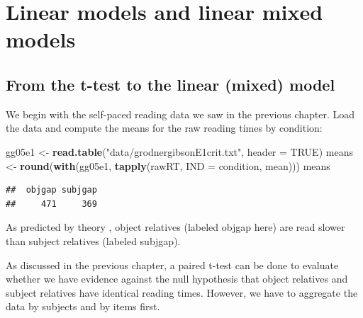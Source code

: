 \documentclass[12pt,]{krantz}
\newenvironment{Shaded}{\begin{snugshade}}{\end{snugshade}}
\newcommand{\DataTypeTok}[1]{\textcolor[rgb]{0.13,0.29,0.53}{#1}}
\newcommand{\KeywordTok}[1]{\textcolor[rgb]{0.13,0.29,0.53}{\textbf{#1}}}
\newcommand{\NormalTok}[1]{#1}
\newcommand{\OperatorTok}[1]{\textcolor[rgb]{0.81,0.36,0.00}{\textbf{#1}}}
\newcommand{\OtherTok}[1]{\textcolor[rgb]{0.56,0.35,0.01}{#1}}
\newcommand{\StringTok}[1]{\textcolor[rgb]{0.31,0.60,0.02}{#1}}
\begin{document}
\hypertarget{linear-models-and-linear-mixed-models}{%
\chapter{Linear models and linear mixed models}\label{linear-models-and-linear-mixed-models}}

\hypertarget{from-the-t-test-to-the-linear-mixed-model}{%
\section{From the t-test to the linear (mixed) model}\label{from-the-t-test-to-the-linear-mixed-model}}

We begin with the \citet{grodner} self-paced reading data we saw in the previous chapter. Load the data and compute the means for the raw reading times by condition:

\begin{Shaded}
\begin{Highlighting}[]
\NormalTok{gg05e1 <-}\StringTok{ }\KeywordTok{read.table}\NormalTok{(}\StringTok{"data/grodnergibsonE1crit.txt"}\NormalTok{, }
  \DataTypeTok{header =} \OtherTok{TRUE}\NormalTok{)}
\NormalTok{means <-}\StringTok{ }\KeywordTok{round}\NormalTok{(}\KeywordTok{with}\NormalTok{(gg05e1, }\KeywordTok{tapply}\NormalTok{(rawRT, }\DataTypeTok{IND =}\NormalTok{ condition, }
\NormalTok{  mean)))}
\NormalTok{means}
\end{Highlighting}
\end{Shaded}

\begin{verbatim}
##  objgap subjgap 
##     471     369
\end{verbatim}

As predicted by theory \citep{grodner}, object relatives (labeled objgap here) are read slower than subject relatives (labeled subjgap).

As discussed in the previous chapter, a paired t-test can be done to evaluate whether we have evidence against the null hypothesis that object relatives and subject relatives have identical reading times. However, we have to aggregate the data by subjects and by items first.

\begin{Shaded}
\end{Shaded}
\end{document}
